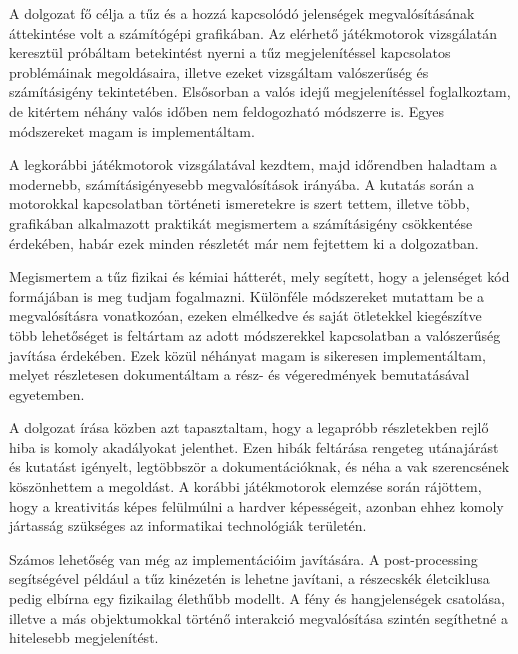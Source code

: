 
A dolgozat fő célja a tűz és a hozzá kapcsolódó jelenségek megvalósításának áttekintése volt a számítógépi grafikában. Az elérhető játékmotorok vizsgálatán keresztül próbáltam betekintést nyerni a tűz megjelenítéssel kapcsolatos problémáinak megoldásaira, illetve ezeket vizsgáltam valószerűség és számításigény tekintetében. Elsősorban a valós idejű megjelenítéssel foglalkoztam, de kitértem néhány valós időben nem feldogozható módszerre is. Egyes módszereket magam is implementáltam.

A legkorábbi játékmotorok vizsgálatával kezdtem, majd időrendben haladtam a modernebb, számításigényesebb megvalósítások irányába. A kutatás során a motorokkal kapcsolatban történeti ismeretekre is szert tettem, illetve több, grafikában alkalmazott praktikát megismertem a számításigény csökkentése érdekében, habár ezek minden részletét már nem fejtettem ki a dolgozatban. 

Megismertem a tűz fizikai és kémiai hátterét, mely segített, hogy a jelenséget kód formájában is meg tudjam fogalmazni. Különféle módszereket mutattam be a megvalósításra vonatkozóan, ezeken elmélkedve és saját ötletekkel kiegészítve több lehetőséget is feltártam az adott módszerekkel kapcsolatban a valószerűség javítása érdekében.
Ezek közül néhányat magam is sikeresen implementáltam, melyet részletesen dokumentáltam a rész- és végeredmények bemutatásával egyetemben. 

A dolgozat írása közben azt tapasztaltam, hogy a legapróbb részletekben rejlő hiba is komoly akadályokat jelenthet. Ezen hibák feltárása rengeteg utánajárást és kutatást igényelt, legtöbbször a dokumentációknak, és néha a vak szerencsének köszönhettem a megoldást. A korábbi játékmotorok elemzése során rájöttem, hogy a kreativitás képes felülmúlni a hardver képességeit, azonban ehhez komoly jártasság szükséges az informatikai technológiák területén. 


Számos lehetőség van még az implementációim javítására. A post-processing segítségével például a tűz kinézetén is lehetne javítani, a részecskék életciklusa pedig elbírna egy fizikailag élethűbb modellt. A fény és hangjelenségek csatolása, illetve a más objektumokkal történő interakció megvalósítása szintén segíthetné a hitelesebb megjelenítést. 

